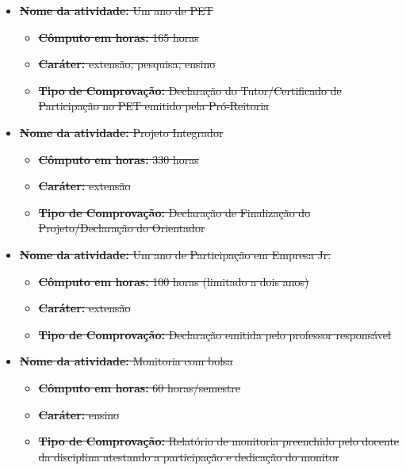 \begin{itemize}
\item \sout{{\bf Nome da atividade:} Um ano de PET}
\begin{itemize}
\item \sout{{\bf Cômputo em horas:} 165 horas}
\item \sout{{\bf Caráter:} extensão, pesquisa, ensino}
\item \sout{{\bf Tipo de Comprovação:} Declaração do Tutor/Certificado de Participação no PET emitido pela Pró-Reitoria}
\end{itemize}
\end{itemize}

\begin{itemize}
\item \sout{{\bf Nome da atividade:} Projeto Integrador}
\begin{itemize}
\item \sout{{\bf Cômputo em horas:} 330 horas}
\item \sout{{\bf Caráter:} extensão}
\item \sout{{\bf Tipo de Comprovação:} Declaração de Finalização do Projeto/Declaração do Orientador}
\end{itemize}
\end{itemize}

\begin{itemize}
\item \sout{{\bf Nome da atividade:} Um ano de Participação em Empresa Jr.}
\begin{itemize}
\item \sout{{\bf Cômputo em horas:} 100 horas (limitado a dois anos)}
\item \sout{{\bf Caráter:} extensão}
\item \sout{{\bf Tipo de Comprovação:} Declaração emitida pelo professor responsável}
\end{itemize}
\end{itemize}

\begin{itemize}
\item \sout{{\bf Nome da atividade:} Monitoria com bolsa}
\begin{itemize}
\item \sout{{\bf Cômputo em horas:} 60 horas/semestre}
\item \sout{{\bf Caráter:} ensino}
\item \sout{{\bf Tipo de Comprovação:} Relatório de monitoria preenchido pelo docente da disciplina atestando a participação e dedicação do monitor}
\end{itemize}
\end{itemize}

